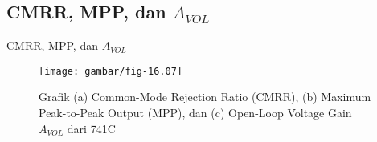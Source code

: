 \subsection{CMRR, MPP, dan $A_{VOL}$}
\begin{frame}{CMRR, MPP, dan $A_{VOL}$}
	\begin{figure}
		\centering
		\texttt{[image: gambar/fig-16.07]}
		\caption{Grafik (a) Common-Mode Rejection Ratio (CMRR), (b) Maximum Peak-to-Peak Output (MPP), dan (c) Open-Loop Voltage Gain $A_{VOL}$ dari 741C}
		\label{fig:fig-16}
	\end{figure}
	\vfill\null
\end{frame}
